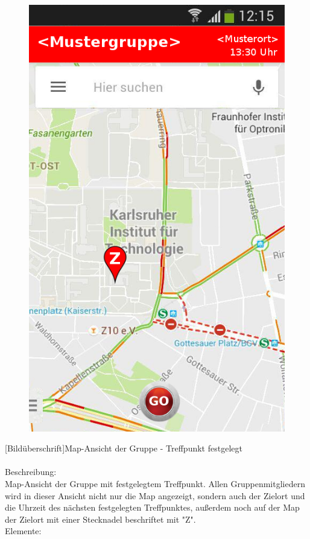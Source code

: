 \begin{figure}
	\includegraphics[scale =1]{resources/images/map.png}
\end{figure}
[Bildüberschrift]Map-Ansicht der Gruppe - Treffpunkt festgelegt\\ \\
[Kleinüberschrift]Beschreibung:\\
Map-Ansicht der Gruppe mit festgelegtem Treffpunkt. Allen Gruppenmitgliedern wird in dieser Ansicht nicht nur die Map angezeigt, sondern auch der Zielort und die Uhrzeit des nächsten festgelegten Treffpunktes, außerdem noch auf der Map der Zielort mit einer Stecknadel beschriftet mit "Z".\\
[Kleinüberschrift]Elemente:\\
